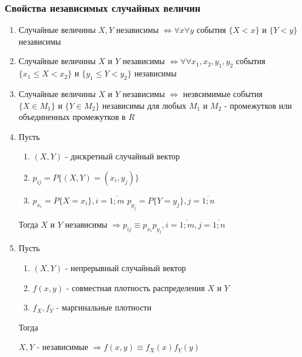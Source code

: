 \documentclass[a4paper, 14pt]{report}
\begin{document}
\subsubsection{Свойства независимых случайных величин}

\begin{enumerate}
    \item Случайные величины $X, Y$ независимы $\Leftrightarrow \forall x \forall y$ события $\{X<x\}$ и $\{Y < y\}$ независимы

    \item Случайные величины $X$ и $Y$ независимы $\Leftrightarrow \forall \forall x_1,x_2,y_1,y_2$ события $\{x_1 \le X < x_2\}$ и $\{ y_1 \le Y < y_2\}$ независимы

    \item Случайные величины $X$ и $Y$ независимы $\Leftrightarrow$ незвсимимые события $\{X \in M_1\}$ и $\{Y \in M_2\}$ независимы для любых $M_1$ и $M_2$ - промежутков или объединенных промежутков в $R$

    \item Пусть

        \begin{enumerate}
            \item $(X,Y)$ - дискретный случайный вектор

            \item $p_{ij} = P\{(X,Y) = (x_i, y_j)\}$

            \item $p_{x_i} = P\{X = x_i\}, i = \overline{1;m}$ $p_{y_j} = P\{Y = y_j\}, j = \overline{1;n}$
        \end{enumerate}

        Тогда $X$ и $Y$ независимы $\Rightarrow p_{ij} \equiv p_{x_i} p_{y_j}, i = \overline{1;m}, j = \overline{1;n}$


    \item Пусть

        \begin{enumerate}
            \item $(X,Y)$ - непрерывный случайный вектор
            \item $f(x,y)$ - совместная плотность распределения $X$ и $Y$
            \item $f_X, f_Y$ - маргинальные плотности
        \end{enumerate}

        Тогда

        $X, Y$ - независимые $\Rightarrow f(x,y) \equiv f_X(x)f_Y(y)$
\end{enumerate}
\end{document}
